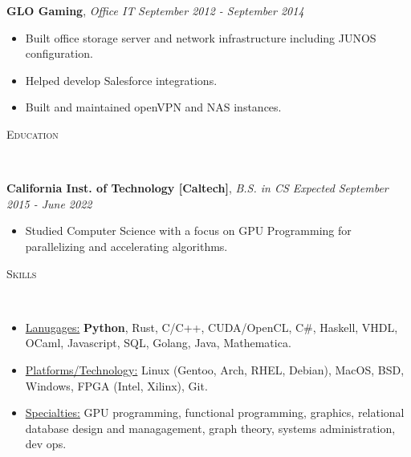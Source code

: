 \documentclass[9pt]{article}
\newenvironment{changemargin}[2]{%
  \begin{list}{}{%
    \setlength{\topsep}{0pt}%
    \setlength{\leftmargin}{#1}%
    \setlength{\rightmargin}{#2}%
    \setlength{\listparindent}{\parindent}%
    \setlength{\itemindent}{\parindent}%
    \setlength{\parsep}{\parskip}%
  }%
  \item[]}{\end{list}
}
\newcommand{\lineover}{
	\begin{changemargin}{-0.05in}{-0.05in}
		\vspace*{-8pt}
		\hrulefill \\
		\vspace*{-2pt}
	\end{changemargin}
}
\newcommand{\header}[1]{
	\begin{changemargin}{-0.5in}{-0.5in}
		\scshape{#1}\\
  	\lineover
	\end{changemargin}
}
\newenvironment{body} {
	\vspace*{-16pt}
	\begin{changemargin}{-0.25in}{-0.5in}
  }	
	{\end{changemargin}
}
\begin{document}
\begin{body}
	\textbf{GLO Gaming}, \emph{Office IT} \hfill \emph{September 2012 - September 2014}\\
	\vspace*{-3pt}
	\begin{itemize} \itemsep -0pt %
		\item Built office storage server and network infrastructure including JUNOS configuration.
		\item Helped develop Salesforce integrations.
		\item Built and maintained openVPN and NAS instances.
	\end{itemize}
	\vspace*{-2pt}

	\smallskip
	\vspace*{-3pt}
	\vspace*{-5pt}
	\smallskip

	\header{Education}
	\begin{body}
		\vspace{16pt}
		\textbf{California Inst. of Technology [Caltech]}{}, \emph{B.S. in CS Expected} \hfill \emph{September 2015 - June 2022}{} \\
		\vspace{-3pt}
		\begin{itemize} \itemsep -0pt
			\item Studied Computer Science with a focus on GPU Programming for parallelizing and accelerating algorithms.
		\end{itemize}
	\end{body}

	\smallskip
	\vspace*{-3pt}


\end{body}

\smallskip

\header{Skills}
\smallskip
\begin{body}
	\vspace{14pt}
	\begin{itemize} \itemsep -0pt

		\item \uline{Lanugages:} \textbf{Python}, Rust, C/C++, CUDA/OpenCL, C\#, Haskell, VHDL, OCaml, Javascript, SQL, Golang, Java, Mathematica.

		\item \uline{Platforms/Technology:} Linux (Gentoo, Arch, RHEL, Debian), MacOS,
		      BSD, Windows, FPGA (Intel, Xilinx), Git.
		\item \uline{Specialties:} GPU programming, functional programming, graphics, relational database design and managagement, graph theory, systems administration, dev ops.
	\end{itemize}
\end{body}
\end{document}
